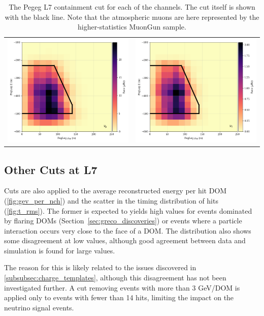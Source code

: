 \begin{center}
\begin{table}
\begin{tabular}{cc}
    \includegraphics[width=0.45\linewidth]{pegleg_z_rho_genie_numu.png} &  
    \includegraphics[width=0.45\linewidth]{pegleg_z_rho_genie_nutau.png} \\ 
\end{tabular}
\label{fig:pegleg_zVsRho}
\caption[The Pegleg containment cuts applied at Level 7]{The Pegeg L7 containment cut for each of the channels. The cut itself is shown with the black line. Note that the atmospheric muons are here represented by the higher-statistics MuonGun sample.}
\end{table}
\end{center}







\label{subsec:other_l7_cuts}
\subsection{Other Cuts at L7}
Cuts are also applied to the average reconstructed energy per hit DOM (\ref{fig:gev_per_nch}) and the scatter in the timing distribution of hits (\ref{fig:t_rms}).
The former is expected to yields high values for events dominated by flaring DOMs (Section~\ref{sec:greco_discoveries}) or events where a particle interaction occurs very close to the face of a DOM.
The distribution also shows some disagreement at low values, although good agreement between data and simulation is found for large values.

The reason for this is likely related to the issues discovered in \ref{subsubsec:charge_templates}, although this disagreement has not been investigated further.
A cut removing events with more than 3 GeV/DOM is applied only to events with fewer than 14 hits, limiting the impact on the neutrino signal events.

